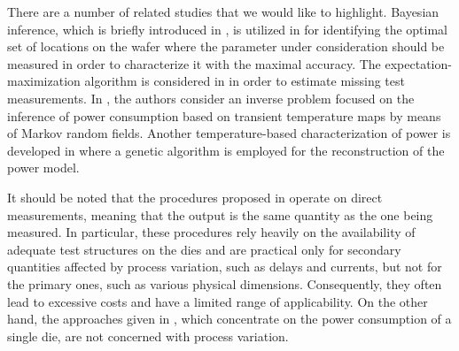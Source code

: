 There are a number of related studies that we would like to highlight. Bayesian
inference, which is briefly introduced in , is
utilized in \cite{zhang2010} for identifying the optimal set of locations on the
wafer where the parameter under consideration should be measured in order to
characterize it with the maximal accuracy. The expectation-maximization
algorithm is considered in \cite{reda2009} in order to estimate missing test
measurements. In \cite{paek2012}, the authors consider an inverse problem
focused on the inference of power consumption based on transient temperature
maps by means of Markov random fields. Another temperature-based
characterization of power is developed in \cite{mesa-martinez2007} where a
genetic algorithm is employed for the reconstruction of the power model.

It should be noted that the procedures proposed in \cite{reda2009, zhang2010}
operate on direct measurements, meaning that the output is the same quantity as
the one being measured. In particular, these procedures rely heavily on the
availability of adequate test structures on the dies and are practical only for
secondary quantities affected by process variation, such as delays and currents,
but not for the primary ones, such as various physical dimensions. Consequently,
they often lead to excessive costs and have a limited range of applicability. On
the other hand, the approaches given in \cite{mesa-martinez2007, paek2012},
which concentrate on the power consumption of a single die, are not concerned
with process variation.
